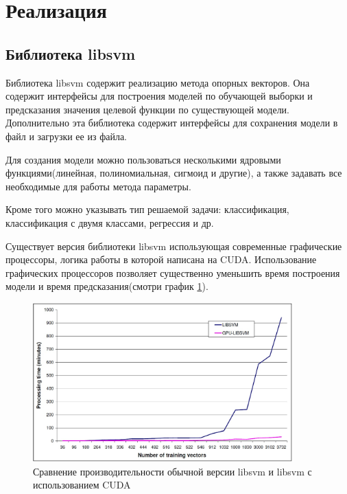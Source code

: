 \newpage
\section{Реализация}

\subsection{Библиотека libsvm}
Библиотека libsvm содержит реализацию метода опорных векторов. Она содержит интерфейсы для построения моделей по обучающей выборки и предсказания значения целевой функции по  существующей модели. Дополнительно эта библиотека содержит интерфейсы для сохранения модели в файл и загрузки ее из файла.

Для создания модели можно пользоваться несколькими ядровыми функциями(линейная, полиномиальная, сигмоид и другие), а также задавать все необходимые для работы метода параметры.

Кроме того можно указывать тип решаемой задачи: классификация, классификация с двумя классами, регрессия и др.

Существует\cite{GPUSVM} версия библиотеки libsvm использующая современные графические процессоры, логика работы в которой написана на CUDA. Использование графических процессоров позволяет существенно уменьшить время построения модели и время предсказания(смотри график \ref{CUDASVM}).

\begin{figure}[h]
\begin{center}
\includegraphics[width=10cm]{img/GPULIBSVM-comparison}
\end{center}
\caption{Сравнение производительности обычной версии libsvm и libsvm с использованием CUDA}
\label{CUDASVM}
\end{figure}

